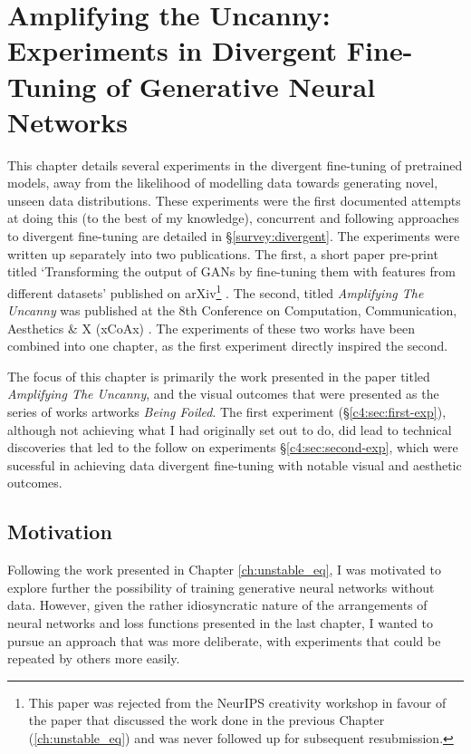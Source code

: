 \chapter{Amplifying the Uncanny: Experiments in Divergent Fine-Tuning of Generative Neural Networks}
\label{ch:uncanny}

This chapter details several experiments in the divergent fine-tuning of pretrained models, away from the likelihood of modelling data towards generating novel, unseen data distributions. 
These experiments were the first documented attempts at doing this (to the best of my knowledge), concurrent and following approaches to divergent fine-tuning are detailed in \S \ref{survey:divergent}. 
The experiments were written up separately into two publications. 
The first, a short paper pre-print titled `Transforming the output of GANs by fine-tuning them with features from different datasets’ published on arXiv\footnote{
    This paper was rejected from the NeurIPS creativity workshop in favour of the paper that discussed the work done in the previous Chapter (\ref{ch:unstable_eq}) \citep{broad2019searching} and was never followed up for subsequent resubmission.} \citep{broad2019transforming}. 
The second, titled \textit{Amplifying The Uncanny} was published at the 8th Conference on Computation, Communication, Aesthetics \& X (xCoAx) \citep{broad2020amplifying}. 
The experiments of these two works have been combined into one chapter, as the first experiment directly inspired the second.

The focus of this chapter is primarily the work presented in the paper titled \textit{Amplifying The Uncanny}, and the visual outcomes that were presented as the series of works artworks \textit{Being Foiled}. 
The first experiment (\S \ref{c4:sec:first-exp}), although not achieving what I had originally set out to do, did lead to technical discoveries that led to the follow on experiments \S \ref{c4:sec:second-exp}, which were sucessful in achieving data divergent fine-tuning with notable visual and aesthetic outcomes.

\section{Motivation}

Following the work presented in Chapter \ref{ch:unstable_eq}, I was motivated to explore further the possibility of training generative neural networks without data. 
However, given the rather idiosyncratic nature of the arrangements of neural networks and loss functions presented in the last chapter, I wanted to pursue an approach that was more deliberate, with experiments that could be repeated by others more easily. 

